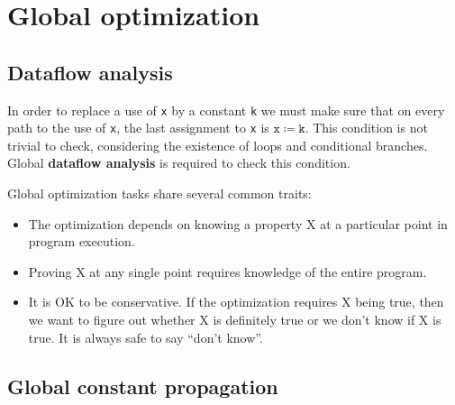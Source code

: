 \section{Global optimization}
\subsection{Dataflow analysis}
In order to replace a use of \texttt{x} by a constant \texttt{k} we must make sure that on every path to the use of \texttt{x}, the last assignment to \texttt{x} is $\mathtt{x\coloneqq k}$. This condition is not trivial to check, considering the existence of loops and conditional branches. Global \textbf{dataflow analysis} is required to check this condition.

Global optimization tasks share several common traits:
\begin{itemize}
\item The optimization depends on knowing a property X at a particular point in program execution.
\item Proving X at any single point requires knowledge of the entire program.
\item It is OK to be conservative. If the optimization requires X being true, then we want to figure out whether X is definitely true or we don't know if X is true. It is always safe to say ``don't know''.
\end{itemize}
\subsection{Global constant propagation}

\ifx\PREAMBLE\undefined

\fi